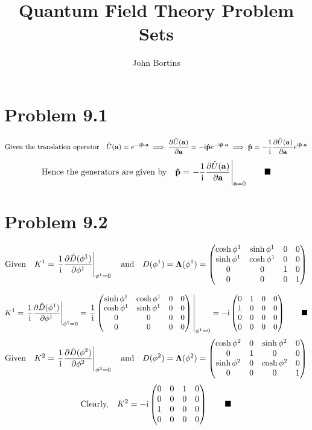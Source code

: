 \documentclass{article}
\title{Quantum Field Theory Problem Sets}
\author{John Bortins}
\begin{document}
 
\maketitle{}
 
\section*{Problem 9.1}


\[\qq*{Given the translation operator}\hat{U}(\vb{a})=e^{-\text{i}\vb{\hat{p}}\cdot\vb{a}}\implies\pdv{\hat{U}(\vb{a})}{\vb{a}}=-\text{i}\vb{\hat{p}}e^{-\text{i}\vb{\hat{p}}\cdot\vb{a}}\implies\vb{\hat{p}}=-\frac{1}{\text{i}}\pdv{\hat{U}(\vb{a})}{\vb{a}}e^{\text{i}\vb{\hat{p}}\cdot\vb{a}}
\]
\[\qq*{Hence the generators are given by}\vb{\hat{p}}=\eval{-\frac{1}{\text{i}}\pdv{\hat{U}(\vb{a})}{\vb{a}}}_{\vb{a}=0}\qquad\blacksquare
\] 
\section*{Problem 9.2}

\[\qq*{Given}K^1=\eval{\frac{1}{\text{i}}\pdv{\hat{D}(\phi^1)}{\phi^1}}_{\phi^1=0}\qq{and}
D(\phi^1)=\vb{\Lambda}(\phi^1)=\begin{pmatrix}
\cosh{\phi^1}&\sinh{\phi^1}&0&0\\
\sinh{\phi^1}&\cosh{\phi^1} & 0&0 \\ 
0 & 0&1&0\\
0&0&0&1
\end{pmatrix}
\]

\[K^1=\eval{\frac{1}{\text{i}}\pdv{\hat{D}(\phi^1)}{\phi^1}}_{\phi^1=0}=\eval{\frac{1}{\text{i}}\begin{pmatrix}
		\sinh{\phi^1}&\cosh{\phi^1}&0&0\\
		\cosh{\phi^1}&\sinh{\phi^1} & 0&0 \\ 
		0 & 0&0&0\\
		0&0&0&0
		\end{pmatrix}}_{\phi^1=0}=-\text{i}\begin{pmatrix}
		0&1&0&0\\
		1&0 & 0&0 \\ 
		0 & 0&0&0\\
		0&0&0&0
		\end{pmatrix}\qquad\blacksquare
\]
\[\qq*{Given}K^2=\eval{\frac{1}{\text{i}}\pdv{\hat{D}(\phi^2)}{\phi^2}}_{\phi^2=0}\qq{and}
D(\phi^2)=\vb{\Lambda}(\phi^2)=\begin{pmatrix}
\cosh{\phi^2}&0&\sinh{\phi^2}&0\\
0&1 & 0&0 \\ 
\sinh{\phi^2} & 0&\cosh{\phi^2}&0\\
0&0&0&1
\end{pmatrix}
\]
\[\qq*{Clearly,}K^2=-\text{i}\begin{pmatrix}
		0&0&1&0\\
		0 & 0&0&0\\
		1&0 & 0&0 \\ 
		0&0&0&0
		\end{pmatrix}\qquad\blacksquare
\]
\end{document}
